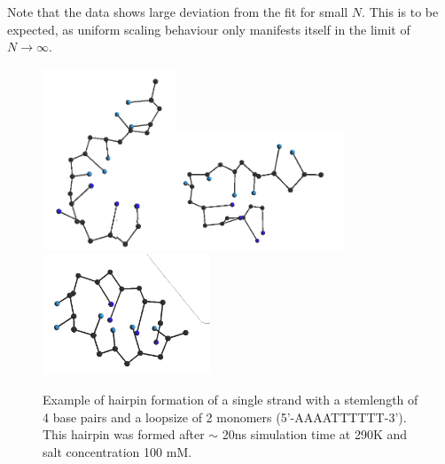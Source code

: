 Note that the data shows large deviation from the fit for small $N$. This is to be expected, as uniform scaling behaviour only manifests itself in the limit of $N \to \infty$.


\begin{figure}[hbt]
\begin{center}
\includegraphics[width=4cm]{images/results_hairpin1}\includegraphics[width=5cm]{images/results_hairpin2}\includegraphics[width=5cm]{images/results_hairpin3}
\end{center}
\caption{Example of hairpin formation of a single strand with a stemlength of 4 base pairs and a loopsize of 2 monomers (5'-AAAATTTTTT-3'). This hairpin was formed after $\sim$ 20ns simulation time at 290K and salt concentration 100 mM.}
\label{results_hairpin}
\end{figure}




